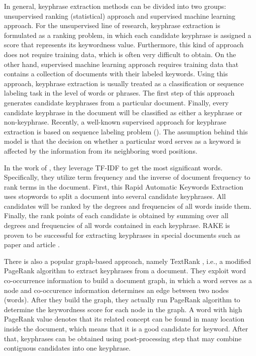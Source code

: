 \iffalse
In general, keyphrase extraction methods can be divided into two groups: unsupervised ranking (statistical) approach and supervised machine learning approach. For the unsupervised line of research, keyphrase extraction is formulated as a ranking problem, in which each candidate keyphrase is assigned a score that represents its keywordness value. Furthermore, this kind of approach does not require training data, which is often very difficult to obtain. On the other hand, supervised machine learning approach requires training data that contains a collection of documents with their labeled keywords. Using this approach, keyphrase extraction is usually treated as a classification or sequence labeling task in the level of words or phrases. The first step of this approach generates candidate keyphrases from a particular document. Finally, every candidate keyphrase in the document will be classified as either a keyphrase or non-keyphrase. Recently, a well-known supervised approach for keyphrase extraction is based on sequence labeling problem (\cite{zhang2008automatic}\cite{cao2010automatically}\cite{zhang2016keyphrase}). The assumption behind this model is that the decision on whether a particular word serves as a keyword is affected by the information from its neighboring word positions.

In the work of \cite{sparck1972statistical}, they leverage TF-IDF to get the most significant words. Specifically, they utilize term frequency and the inverse of document frequency to rank terms in the document. First, this Rapid Automatic Keywords Extraction \cite{rake} uses stopwords to split a document into several candidate keyphrases. All candidates will be ranked by the degrees and frequencies of all words inside them. Finally, the rank points of each candidate is obtained by summing over all degrees and frequencies of all words contained in each keyphrase. RAKE is proven to be successful for extracting keyphrases in special documents such as paper and article \cite{rake}.

There is also a popular graph-based approach, namely TextRank \cite{mihalcea2004textrank}, i.e., a modified PageRank algorithm to extract keyphrases from a document. They exploit word co-occurrence information to build a document graph, in which a word serves as a node and co-occurence information determines an edge between two nodes (words). After they build the graph, they actually run PageRank algorithm to determine the keywordness score for each node in the graph. A word with high PageRank value denotes that its related concept can be found in many location inside the document, which means that it is a good candidate for keyword. After that, keyphrases can be obtained using post-processing step that may combine contiguous candidates into one keyphrase.

